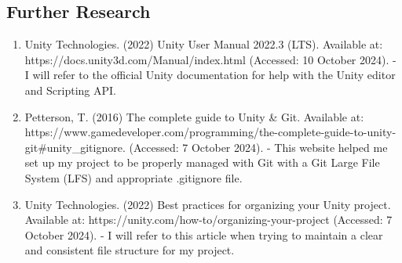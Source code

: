 \documentclass[12pt]{article}
\begin{document}
	\subsection{Further Research}
	\begin{enumerate}
	\item Unity Technologies. (2022) Unity User Manual 2022.3 (LTS). Available at: https://docs.unity3d.com/Manual/index.html (Accessed: 10 October 2024). - I will refer to the official Unity documentation for help with the Unity editor and Scripting API. 
	\item Petterson, T. (2016) The complete guide to Unity \& Git. 
	\newline Available at: https://www.gamedeveloper.com/programming/the-complete-guide-to-unity-git\#unity\_gitignore. (Accessed: 7 October 2024). - This website helped me set up my project to be properly managed with Git with a Git Large File System (LFS) and appropriate .gitignore file.
 	\item Unity Technologies. (2022) Best practices for organizing your Unity project. Available at: https://unity.com/how-to/organizing-your-project (Accessed: 7 October 2024). - I will refer to this article when trying to maintain a clear and consistent file structure for my project.
	\end{enumerate}
\end{document}
